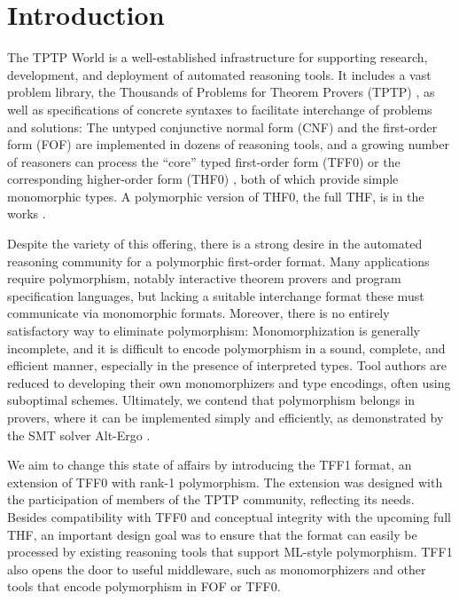 \section{Introduction}
\label{sec_intro}

The TPTP World \cite{sutcliffe-2010-world} is a well-established infrastructure
for supporting research, development, and deployment of automated reasoning
tools. It includes a vast problem library, the Thousands of Problems for Theorem
Provers (TPTP) \cite{sutcliffe-2009-lib}, as well as specifications of concrete
syntaxes to facilitate interchange of problems and solutions: The untyped
conjunctive normal form (CNF) and the first-order form (FOF) are implemented in
dozens of reasoning tools, and a growing number of reasoners can process the
``core'' typed first-order form (TFF0) \cite{sutcliffe-et-al-2011-tff0} or the
corresponding higher-order form (THF0) \cite{benzmueller-et-al-2008-thf0}, both
of which provide simple monomorphic types. %
A polymorphic version of THF0, the full THF, is in the works
\cite{sutcliffe-benzmueller-2010}.

Despite the variety of this offering, there is a strong desire in the automated
reasoning community for a polymorphic first-order format. Many applications
require polymorphism, notably interactive theorem provers and program
specification languages, but lacking a suitable interchange format these
must communicate via monomorphic formats. Moreover, there is no entirely
satisfactory way to eliminate polymorphism: Monomorphization is generally
incomplete, and it is difficult to encode polymorphism in a sound, complete, and
efficient manner, especially in the presence of interpreted types. Tool authors
are reduced to developing their own monomorphizers and type encodings, often
using suboptimal schemes. Ultimately, we contend that polymorphism belongs in
provers, where it can be implemented simply and efficiently, as demonstrated by
the SMT solver Alt-Ergo \cite{bobot-et-al-2008}.

We aim to change this state of affairs by introducing the TFF1
format, an extension of TFF0 with rank-1 polymorphism. The
extension was designed with the participation of members of the TPTP community,
reflecting its needs.
Besides compatibility with TFF0 and conceptual integrity with the upcoming full
THF, an important design goal was to ensure that the format can easily be
processed by existing reasoning tools that support ML-style polymorphism. TFF1
also opens the door to useful middleware, such as monomorphizers and other
tools that encode polymorphism in FOF or TFF0.

